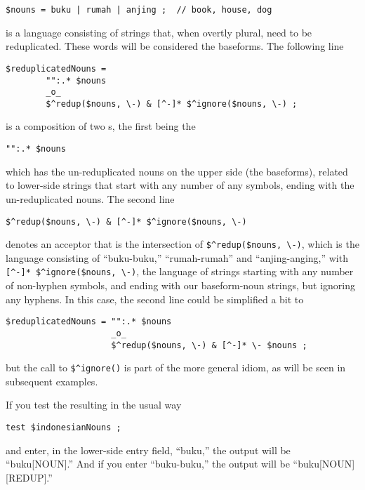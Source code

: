 \begin{Verbatim}
$nouns = buku | rumah | anjing ;  // book, house, dog
\end{Verbatim}

\noindent
is a language consisting of strings that, when overtly plural, need to be reduplicated.
These words will be considered the baseforms.
The following line

\begin{Verbatim}
$reduplicatedNouns = 
        "":.* $nouns 
        _o_
        $^redup($nouns, \-) & [^-]* $^ignore($nouns, \-) ;
\end{Verbatim}

\noindent
is a composition of two \fsm{}s, the first being the \fst{} 

\begin{Verbatim}
"":.* $nouns
\end{Verbatim}

\noindent
which has the un-reduplicated nouns on the upper side (the baseforms), related to lower-side
strings that start with any number of any symbols, ending with the un-reduplicated nouns.
The second line 

\begin{Verbatim}
$^redup($nouns, \-) & [^-]* $^ignore($nouns, \-)
\end{Verbatim}

\noindent
denotes
an acceptor that is the intersection of \verb!$^redup($nouns, \-)!, which is the language
consisting of ``buku-buku,'' ``rumah-rumah'' and ``anjing-anging,'' with 
\verb![^-]* $^ignore($nouns, \-)!, the language of strings starting with any number of
non-hyphen symbols, and ending with our baseform-noun strings, but ignoring any hyphens.
In this case, the second line could be simplified a bit to

\begin{Verbatim}
$reduplicatedNouns = "":.* $nouns 
                     _o_
                     $^redup($nouns, \-) & [^-]* \- $nouns ;
\end{Verbatim}

\noindent
but the call to \verb!$^ignore()! is part of the more general idiom, as will be seen in subsequent
examples.

If you test the resulting \fst{} in the usual way


\begin{Verbatim}
test $indonesianNouns ;
\end{Verbatim}

\noindent
and enter, in the lower-side entry field, ``buku,'' the output will be ``buku[NOUN].''  And if you enter
``buku-buku,'' the output will be ``buku[NOUN][REDUP].''



